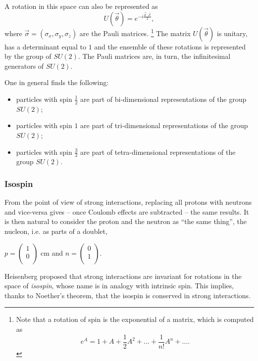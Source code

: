 A rotation in this space can also be represented as
\[
 U(\vec{\theta})=e^{-i \frac{\vec{\theta} \cdot \vec{\sigma}}{2}},
\]
where \(\vec{\sigma}=(\sigma_x,\sigma_y,\sigma_z)\) are the Pauli matrices. \footnote{Note that a rotation of spin is the exponential of a matrix, which is computed as
\[
e^A=1+A+\frac{1}{2}A^2+\dots +\frac{1}{n!}A^n+\dots.
\]}
The matrix $U(\vec{\theta})$ is unitary, has a determinant equal to \(1\) and the ensemble of these rotations is represented by the group of \(SU(2)\). The Pauli matrices are, in turn, the infinitesimal generators of \(SU(2)\).

One in general finds the following:
\begin{itemize}
    \item particles with spin $\frac{1}{2}$ are part of bi-dimensional representations of the group \(SU(2)\);
    \item particles with spin \(1\) are part of tri-dimensional representations of the group \(SU(2)\);
     \item particles with spin $\frac{3}{2}$ are part of tetra-dimensional representations of the group \(SU(2)\).
\end{itemize}

\subsubsection{Isospin}
From the point of view of strong interactions, replacing all protons with neutrons and vice-versa gives -- once Coulomb effects are subtracted -- the same results. It is then natural to consider the proton and the neutron as ``the same thing'', the nucleon, i.e. as parts of a doublet,
\begin{center}
   $ p=\begin{pmatrix} 1\\ 0\\ 
\end{pmatrix} $  cm and \hskip 0.6cm $ n=\begin{pmatrix} 0\\ 1\\
\end{pmatrix} $.
\end{center}
Heisenberg proposed that strong interactions are invariant for rotations in the space of \emph{isospin}, whose name is in analogy with intrinsic spin.
This implies, thanks to  Noether's theorem, that the isospin is conserved in strong interactions.

